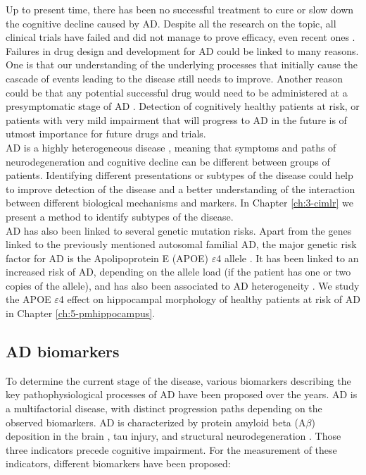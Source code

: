 Up to present time, there has been no successful treatment to cure or slow down the cognitive decline caused by AD. Despite all the research on the topic, all clinical trials have failed \cite{Mehta2017} and did not manage to prove efficacy, even recent ones \cite{Huang2020}. Failures in drug design and development for AD could be linked to many reasons. One is that our understanding of the underlying processes that initially cause the cascade of events leading to the disease still needs to improve. Another reason could be that any potential successful drug would need to be administered at a presymptomatic stage of AD \cite{Mehta2017,Huang2020}. Detection of cognitively healthy patients at risk, or patients with very mild impairment that will progress to AD in the future is of utmost importance for future drugs and trials. \\ 

AD is a highly heterogeneous disease \cite{Lam2013}, meaning that symptoms and paths of neurodegeneration and cognitive decline can be different between groups of patients. Identifying different presentations or subtypes of the disease could help to improve detection of the disease and a better understanding of the interaction between different biological mechanisms and markers. In Chapter \ref{ch:3-cimlr} we present a method to identify subtypes of the disease. \\

AD has also been linked to several genetic mutation risks. Apart from the genes linked to the previously mentioned autosomal familial AD, the major genetic risk factor for AD is the Apolipoprotein E (APOE) $\varepsilon$4 allele \cite{Saunders1993}. It has been linked to an increased risk of AD, depending on the allele load \cite{Liu2013a} (if the patient has one or two copies of the allele), and has also been associated to AD heterogeneity \cite{Emrani2020}. We study the APOE $\varepsilon$4 effect on hippocampal morphology of healthy patients at risk of AD in Chapter \ref{ch:5-pmhippocampus}.

\subsection{AD biomarkers}

To determine the current stage of the disease, various biomarkers describing the key pathophysiological processes of AD have been proposed over the years. AD is a multifactorial disease, with distinct progression paths depending on the observed biomarkers. AD is characterized by protein amyloid beta (A$\beta$) deposition in the brain \cite{Rissman2012}, tau injury, and structural neurodegeneration \cite{Jack2013}. Those three indicators precede cognitive impairment. For the measurement of these indicators, different biomarkers have been proposed:

